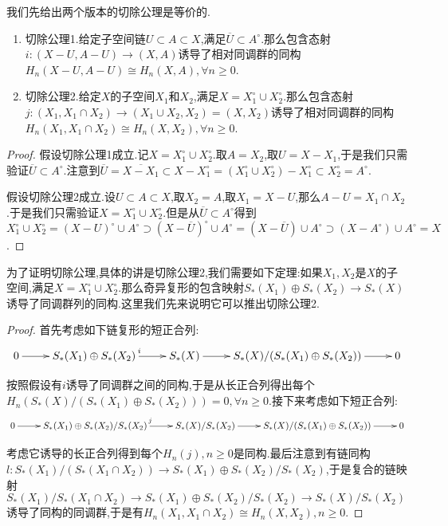 我们先给出两个版本的切除公理是等价的.
\begin{enumerate}
	\item 切除公理1.给定子空间链$U\subset A\subset X$,满足$\overline{U}\subset A^{\circ}$.那么包含态射$i:(X-U,A-U)\to(X,A)$诱导了相对同调群的同构$H_n(X-U,A-U)\cong H_n(X,A),\forall n\ge0$.
	\item 切除公理2.给定$X$的子空间$X_1$和$X_2$,满足$X=X_1^{\circ}\cup X_2^{\circ}$.那么包含态射$j:(X_1,X_1\cap X_2)\to(X_1\cup X_2,X_2)=(X,X_2)$诱导了相对同调群的同构$H_n(X_1,X_1\cap X_2)\cong H_n(X,X_2),\forall n\ge0$.
\end{enumerate}
\begin{proof}
	
	假设切除公理1成立.记$X=X_1^{\circ}\cup X_2^{\circ}$.取$A=X_2$,取$U=X-X_1$,于是我们只需验证$\overline{U}\subset A^{\circ}$.注意到$\overline{U}=\overline{X-X_1}\subset X-X_1^{\circ}=(X_1^{\circ}\cup X_2^{\circ})-X_1^{\circ}\subset X_2^{\circ}=A^{\circ}$.
	
	假设切除公理2成立.设$U\subset A\subset X$,取$X_2=A$,取$X_1=X-U$,那么$A-U=X_1\cap X_2$.于是我们只需验证$X=X_1^{\circ}\cup X_2^{\circ}$.但是从$\overline{U}\subset A^{\circ}$得到$X_1^{\circ}\cup X_2^{\circ}=(X-U)^{\circ}\cup A^{\circ}\supset(X-\overline{U})^{\circ}\cup A^{\circ}=(X-\overline{U})\cup A^{\circ}\supset(X-A^{\circ})\cup A^{\circ}=X$.
\end{proof}

为了证明切除公理,具体的讲是切除公理2,我们需要如下定理:如果$X_1,X_2$是$X$的子空间,满足$X=X_1^{\circ}\cup X_2^{\circ}$.那么奇异复形的包含映射$S_*(X_1)\oplus S_*(X_2)\to S_*(X)$诱导了同调群列的同构.这里我们先来说明它可以推出切除公理2.
\begin{proof}
	
	首先考虑如下链复形的短正合列:
	$$\xymatrix{0\ar[r]&S_*(X_1)\oplus S_*(X_2)\ar[r]^i&S_*(X)\ar[r]&S_*(X)/(S_*(X_1)\oplus S_*(X_2))\ar[r]&0}$$
	
	按照假设有$i$诱导了同调群之间的同构,于是从长正合列得出每个$H_n(S_*(X)/(S_*(X_1)\oplus S_*(X_2)))=0,\forall n\ge0$.接下来考虑如下短正合列:
	$$\xymatrix{0\ar[r]&S_*(X_1)\oplus S_*(X_2)/S_*(X_2)\ar[r]^j&S_*(X)/S_*(X_2)\ar[r]&S_*(X)/(S_*(X_1)\oplus S_*(X_2))\ar[r]&0}$$
	
	考虑它诱导的长正合列得到每个$H_n(j),n\ge0$是同构.最后注意到有链同构$l:S_*(X_1)/(S_*(X_1\cap X_2))\to S_*(X_1)\oplus S_*(X_2)/S_*(X_2)$,于是复合的链映射$S_*(X_1)/S_*(X_1\cap X_2)\to S_*(X_1)\oplus S_*(X_2)/S_*(X_2)\to S_*(X)/S_*(X_2)$诱导了同构的同调群,于是有$H_n(X_1,X_1\cap X_2)\cong H_n(X,X_2),n\ge0$.
\end{proof}

